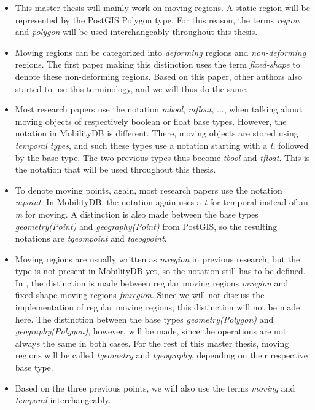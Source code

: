 \begin{itemize}
    \item This master thesis will mainly work on moving regions. A static region will be represented by the PostGIS Polygon type. For this reason, the terms \textit{region} and \textit{polygon} will be used interchangeably throughout this thesis.

    \item Moving regions can be categorized into \textit{deforming} regions and \textit{non-deforming} regions. The first paper making this distinction uses the term \textit{fixed-shape} to denote these non-deforming regions. Based on this paper, other authors  also started to use this terminology, and we will thus do the same.

    \item Most research papers use the notation \textit{mbool}, \textit{mfloat}, ..., when talking about moving objects of respectively boolean or float base types. However, the notation in MobilityDB is different. There, moving objects are stored using \textit{temporal types}, and such these types use a notation starting with a \textit{t}, followed by the base type. The two previous types thus become \textit{tbool} and \textit{tfloat}. This is the notation that will be used throughout this thesis.

    \item To denote moving points, again, most research papers use the notation \textit{mpoint}. In MobilityDB, the notation again uses a \textit{t} for temporal instead of an \textit{m} for moving. A distinction is also made between the base types \textit{geometry(Point)} and \textit{geography(Point)} from PostGIS, so the resulting notations are \textit{tgeompoint} and \textit{tgeogpoint}.

    \item Moving regions are usually written as \textit{mregion} in previous research, but the type is not present in MobilityDB yet, so the notation still has to be defined. In , the distinction is made between regular moving regions \textit{mregion} and fixed-shape moving regions \textit{fmregion}. Since we will not discuss the implementation of regular moving regions, this distinction will not be made here. The distinction between the base types \textit{geometry(Polygon)} and \textit{geography(Polygon)}, however, will be made, since the operations are not always the same in both cases. For the rest of this master thesis, moving regions will be called \textit{tgeometry} and \textit{tgeography}, depending on their respective base type.

    \item Based on the three previous points, we will also use the terms \textit{moving} and \textit{temporal} interchangeably.
\end{itemize}